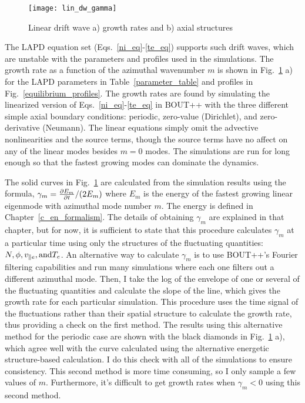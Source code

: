 \begin{figure}[!ht]
\centerline{\texttt{[image: lin\_dw\_gamma]}}
\caption{Linear drift wave a) growth rates and b) axial structures}
\label{lin_dw_gamma}
\end{figure}

The LAPD equation set (Eqs.~\ref{ni_eq}-\ref{te_eq}) supports such drift waves, which are unstable with the parameters and profiles used in the simulations. 
The growth rate as a function of the azimuthal
wavenumber $m$ is shown in Fig.~\ref{lin_dw_gamma} a) for the LAPD parameters in Table~\ref{parameter_table} and profiles in Fig.~\ref{equilibrium_profiles}. The growth rates are found by simulating
the linearized version of Eqs.~\ref{ni_eq}-\ref{te_eq} in BOUT++ with the three different simple axial boundary conditions: periodic, zero-value (Dirichlet), and zero-derivative (Neumann). 
The linear equations simply omit the advective nonlinearities and the source terms, though the source terms have no affect on any of the linear modes besides $m=0$ modes. The simulations are run
for long enough so that the fastest growing modes can dominate the dynamics.

The solid curves in Fig.~\ref{lin_dw_gamma} are calculated from the simulation results using the formula, $\gamma_m = \frac{\partial E_m}{\partial t}/(2 E_m)$ where $E_m$ is the energy of the fastest
growing linear eigenmode with azimuthal mode number $m$.
The energy is defined in Chapter~\ref{c_en_formalism}. The details of obtaining $\gamma_m$ are explained in that chapter, but for now, it is sufficient to state that this procedure calculates
$\gamma_m$ at a particular time using only the structures of the fluctuating quantities: $N, \phi, v_{\parallel e}, {\rm and } T_e$. An alternative way to calculate $\gamma_m$ is to use BOUT++'s Fourier
filtering capabilities and run many simulations where each one filters out a different azimuthal mode. Then, I take the log of the envelope of one or several of the fluctuating quantities
and calculate the slope of the line, which gives the growth rate for each particular simulation. This procedure uses the time signal of the fluctuations rather than their spatial structure to
calculate the growth rate, thus providing a check on the first method. 
The results using this alternative method for the periodic case are shown with the black diamonds in Fig.~\ref{lin_dw_gamma} a), which agree well with the curve calculated using the 
alternative energetic structure-based calculation. I do this check with all of the simulations to ensure consistency. This second method is more time consuming, so I only sample a few values of $m$.
Furthermore, it's difficult to get growth rates when $\gamma_m < 0$ using this second method.

